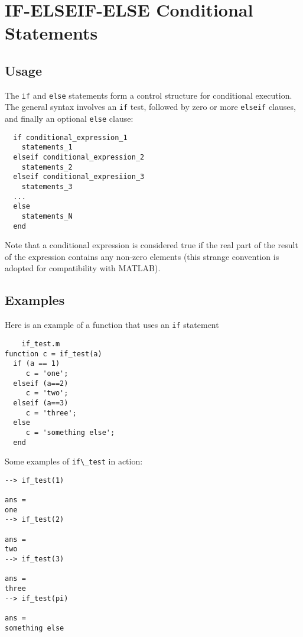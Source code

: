 \section{IF-ELSEIF-ELSE Conditional Statements}

\subsection{Usage}

The \verb|if| and \verb|else| statements form a control structure for
conditional execution.  The general syntax involves an \verb|if|
test, followed by zero or more \verb|elseif| clauses, and finally
an optional \verb|else| clause:
\begin{verbatim}
  if conditional_expression_1
    statements_1
  elseif conditional_expression_2
    statements_2
  elseif conditional_expresiion_3
    statements_3
  ...
  else
    statements_N
  end
\end{verbatim}
Note that a conditional expression is considered true if
the real part of the result of the expression contains
any non-zero elements (this strange convention is adopted
for compatibility with MATLAB).
\subsection{Examples}

Here is an example of a function that uses an \verb|if| statement
\begin{verbatim}
    if_test.m
function c = if_test(a)
  if (a == 1)
     c = 'one';
  elseif (a==2)
     c = 'two';
  elseif (a==3)
     c = 'three';
  else
     c = 'something else';
  end
\end{verbatim}
Some examples of \verb|if\_test| in action:
\begin{verbatim}
--> if_test(1)

ans = 
one
--> if_test(2)

ans = 
two
--> if_test(3)

ans = 
three
--> if_test(pi)

ans = 
something else
\end{verbatim}
